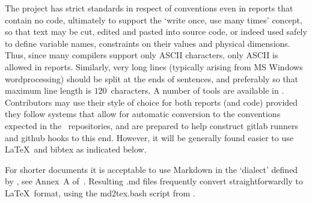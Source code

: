The project has strict standards in respect of conventions even in reports
that contain no code, ultimately to support the `write once, use many times' concept,
so that text may be cut, edited and pasted into source code, or indeed used safely to define
variable names, constraints on their values and physical dimensions.
Thus, since many compilers support only ASCII characters, only ASCII is allowed
in reports. Similarly, very long lines (typically arising from MS Windows wordprocessing)
should be split at the ends of sentences, and preferably so that maximum line length
is $120$~characters. A number of tools are available in .
Contributors may use their style of choice for both reports (and code) provided
they follow systems that allow for automatic conversion to the conventions
expected in the \nep \ repositories, and are prepared to help construct gitlab runners and
github hooks to this end. However, it will be generally found easier to use \LaTeX \ and
bibtex as indicated below.

For shorter documents it is acceptable to use Markdown in the `dialect' defined by
, see Annex~A of~\cite{y3re314}. Resulting .md files frequently convert
straightforwardly to \LaTeX \ format, using the md2tex.bash script from .


